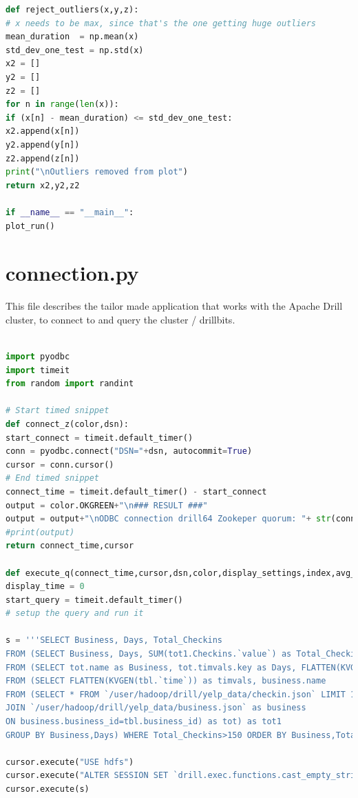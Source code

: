 \documentclass[a4paper,english]{report}
\begin{document}
\begin{lstlisting}[language=Python, caption=plotting.py\, easily allows for visualization of results.]
def reject_outliers(x,y,z):
# x needs to be max, since that's the one getting huge outliers
mean_duration  = np.mean(x)
std_dev_one_test = np.std(x)
x2 = []
y2 = []
z2 = []
for n in range(len(x)):
if (x[n] - mean_duration) <= std_dev_one_test:
x2.append(x[n])
y2.append(y[n])
z2.append(z[n])
print("\nOutliers removed from plot")
return x2,y2,z2

if __name__ == "__main__":
plot_run()
\end{lstlisting}

\section{connection.py}
This file describes the tailor made application that works with the Apache Drill cluster, to connect to and query the cluster / drillbits.
\begin{lstlisting}[language=Python, caption=connection.py\, the file defining how to communicate with the cluster and run queries against it]

import pyodbc
import timeit
from random import randint

# Start timed snippet
def connect_z(color,dsn):
start_connect = timeit.default_timer()
conn = pyodbc.connect("DSN="+dsn, autocommit=True)
cursor = conn.cursor()
# End timed snippet
connect_time = timeit.default_timer() - start_connect
output = color.OKGREEN+"\n### RESULT ###"
output = output+"\nODBC connection drill64 Zookeper quorum: "+ str(connect_time)+" s\n"
#print(output)
return connect_time,cursor

def execute_q(connect_time,cursor,dsn,color,display_settings,index,avg_times):
display_time = 0
start_query = timeit.default_timer()
# setup the query and run it

s = '''SELECT Business, Days, Total_Checkins
FROM (SELECT Business, Days, SUM(tot1.Checkins.`value`) as Total_Checkins
FROM (SELECT tot.name as Business, tot.timvals.key as Days, FLATTEN(KVGEN(tot.timvals.`value`)) as Checkins
FROM (SELECT FLATTEN(KVGEN(tbl.`time`)) as timvals, business.name
FROM (SELECT * FROM `/user/hadoop/drill/yelp_data/checkin.json` LIMIT 1000) as tbl
JOIN `/user/hadoop/drill/yelp_data/business.json` as business
ON business.business_id=tbl.business_id) as tot) as tot1
GROUP BY Business,Days) WHERE Total_Checkins>150 ORDER BY Business,Total_Checkins'''

cursor.execute("USE hdfs")
cursor.execute("ALTER SESSION SET `drill.exec.functions.cast_empty_string_to_null` = true")
cursor.execute(s)


\end{lstlisting}
\end{document}
